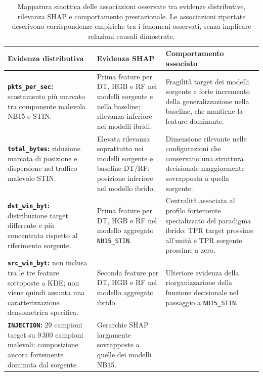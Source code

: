 \begin{table}[H]
    \centering
    \caption{Mappatura sinottica delle associazioni osservate tra evidenze distributive, rilevanza SHAP e comportamento prestazionale. Le associazioni riportate descrivono corrispondenze empiriche tra i fenomeni osservati, senza implicare relazioni causali dimostrate.}
    \label{tab:cap5_cause_effect_mapping}
    \footnotesize
    \begin{tabularx}{\textwidth}{>{\raggedright\arraybackslash}X >{\raggedright\arraybackslash}X >{\raggedright\arraybackslash}X}
        \toprule
        \textbf{Evidenza distributiva} & \textbf{Evidenza SHAP} & \textbf{Comportamento associato} \\
        \midrule
        \textbf{\texttt{pkts\_per\_sec}:} scostamento più marcato tra componente malevola NB15 e STIN.
        & Prima feature per DT, HGB e RF nei modelli sorgente e nella baseline; rilevanza inferiore nei modelli ibridi.
        & Fragilità target dei modelli sorgente e forte incremento della generalizzazione nella baseline, che mantiene la feature dominante. \\
        \addlinespace
        \textbf{\texttt{total\_bytes}:} riduzione marcata di posizione e dispersione nel traffico malevolo STIN.
        & Elevata rilevanza soprattutto nei modelli sorgente e baseline DT/RF; posizione inferiore nel modello ibrido.
        & Dimensione rilevante nelle configurazioni che conservano una struttura decisionale maggiormente sovrapposta a quella sorgente. \\
        \addlinespace
        \textbf{\texttt{dst\_win\_byt}:} distribuzione target differente e più concentrata rispetto al riferimento sorgente.
        & Prima feature per DT, HGB e RF nel modello aggregato \texttt{NB15\_STIN}.
        & Centralità associata al profilo fortemente specializzato del paradigma ibrido: TPR target prossime all'unità e TPR sorgente prossime a zero. \\
        \addlinespace
        \textbf{\texttt{src\_win\_byt}:} non inclusa tra le tre feature sottoposte a KDE; non viene quindi assunta una caratterizzazione densometrica specifica.
        & Seconda feature per DT, HGB e RF nel modello aggregato ibrido.
        & Ulteriore evidenza della riorganizzazione della funzione decisionale nel passaggio a \texttt{NB15\_STIN}. \\
        \addlinespace
        \textbf{\texttt{INJECTION}:} $29$ campioni target su $9\,300$ campioni malevoli; composizione ancora fortemente dominata dal sorgente.
        & Gerarchie SHAP largamente sovrapposte a quelle dei modelli NB15.

\end{tabularx}
\end{table}
